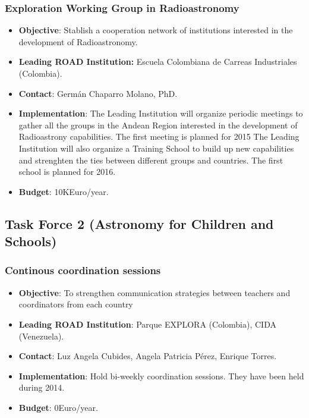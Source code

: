 \documentclass[12pt]{article}
\begin{document}
\subsubsection{Exploration Working Group in Radioastronomy}
\begin{itemize}
\item{\bf Objective}: Stablish a cooperation network of institutions interested in the development of Radioastronomy.
\item{\bf Leading ROAD Institution:} Escuela Colombiana de Carreas
  Industriales (Colombia).
\item{\bf Contact}: Germ\'an Chaparro Molano, PhD.
\item{\bf Implementation}: The Leading Institution will organize
  periodic meetings to gather all the groups in the Andean Region
  interested in the development of Radioastrony capabilities. The
  first meeting is planned for 2015 
The Leading Institution will also organize a Training School to build
up new capabilities and strenghten the ties between different groups
and countries. The first school is planned for 2016.
\item{\bf Budget}: 10KEuro/year.
\end{itemize}

\subsection{Task Force 2 (Astronomy for Children and Schools)}


\subsubsection{Continous coordination sessions}

\begin{itemize}

\item{\bf Objective}: To strengthen communication  strategies between
  teachers  and coordinators from each  country
\item{\bf Leading ROAD Institution}: Parque EXPLORA (Colombia), CIDA
  (Venezuela). 
\item{\bf Contact}: Luz Angela Cubides,  Angela Patricia  P\'erez,
  Enrique  Torres.
\item{\bf Implementation}: Hold bi-weekly coordination sessions. They
  have been held during 2014.
\item{\bf Budget}: 0Euro/year.
\end{itemize}
\end{document}
